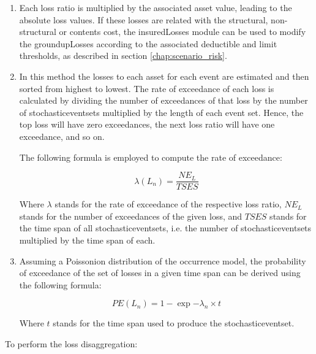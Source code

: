 \begin{enumerate}
\item Each loss ratio is multiplied by the associated asset value, leading to the absolute loss values. If these losses are related with the structural, non-structural or contents cost, the \gls{insuredLosses} module can be used to modify the \gls{groundupLosses} according to the associated \gls{deductible} and \gls{limit} thresholds, as described in section \ref{chap:scenario_risk}.

\item In this method the losses to each \gls{asset} for each event are estimated and then sorted from highest to lowest. The rate of exceedance of each loss is calculated by dividing the number of exceedances of that loss by the number of \glspl{stochasticeventset} multiplied by the length of each event set. Hence, the top loss will have zero exceedances, the next loss ratio will have one exceedance, and so on.

The following formula is employed to compute the rate of exceedance:

\begin{equation}
\lambda(L_n) = \frac{NE_{L}}{TSES}
\end{equation}

Where  $\lambda$ stands for the rate of exceedance of the respective loss ratio, $NE_{L}$ stands for the number of exceedances of the given loss, and $TSES$ stands for the time span of all \glspl{stochasticeventset}, i.e. the number of \glspl{stochasticeventset} multiplied by the time span of each.

\item Assuming a Poissonion distribution of the occurrence model, the probability of exceedance of the set of losses in a given time span can be derived using the following formula:

\begin{equation}
PE(L_n) = 1-\exp{-\lambda_n\times t}
\end{equation}

Where $t$ stands for the time span used to produce the \gls{stochasticeventset}.

\end{enumerate}

To perform the loss disaggregation:

